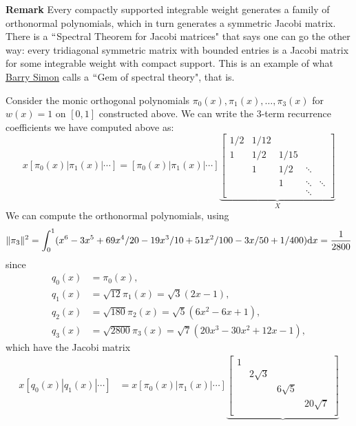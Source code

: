 \textbf{Remark} Every compactly supported integrable weight generates a family of orthonormal polynomials, which in turn generates a symmetric Jacobi matrix. There is a \ensuremath{\ldq}Spectral Theorem for Jacobi matrices" that says one can go the other way: every tridiagonal symmetric matrix with bounded entries is a Jacobi matrix for some integrable weight with compact support. This is an example of what \href{https://en.wikipedia.org/wiki/Barry_Simon}{Barry Simon} calls a \ensuremath{\ldq}Gem of spectral theory", that is.

\begin{example} Consider the monic orthogonal polynomials $\ensuremath{\pi}_0(x),\ensuremath{\pi}_1(x),\ensuremath{\ldots},\ensuremath{\pi}_3(x)$ for $w(x) = 1$ on $[0,1]$ constructed above. We can write the 3-term recurrence coefficients we have computed above as:
\[
x [\ensuremath{\pi}_0(x)| \ensuremath{\pi}_1(x)| \ensuremath{\cdots}] = [\ensuremath{\pi}_0(x)| \ensuremath{\pi}_1(x)| \ensuremath{\cdots}] \underbrace{\begin{bmatrix} 1/2 & 1/12 \\
                                                            1 & 1/2 & 1/15 \\
                                                            & 1 & 1/2 & \ensuremath{\ddots} \\
                                                            & & 1 & \ensuremath{\ddots} & \ensuremath{\ddots} \\
                                                            &&& \ensuremath{\ddots} \end{bmatrix}}_X
\]
We can compute the orthonormal polynomials, using
\[
\|\ensuremath{\pi}_3\|^2 = \int_0^1 (x^6 - 3x^5 + 69x^4/20 -19x^3/10 + 51x^2/100 - 3x/50 + 1/400) {\rm d}x = {1 \over 2800}
\]
since
\begin{align*}
q_0(x) &= \ensuremath{\pi}_0(x), \\
q_1(x) &= \sqrt{12} \ensuremath{\pi}_1(x)= \sqrt{3} (2  x - 1), \\
q_2(x) &= \sqrt{180} \ensuremath{\pi}_2(x) = \sqrt{5} (6x^2 - 6x + 1), \\
q_3(x) &= \sqrt{2800} \ensuremath{\pi}_3(x) = \sqrt{7} (20x^3-30x^2 + 12x - 1),
\end{align*}
which have the Jacobi matrix
\begin{align*}
x [q_0(x)| q_1(x)| \ensuremath{\cdots}] &= x [\ensuremath{\pi}_0(x)| \ensuremath{\pi}_1(x)| \ensuremath{\cdots}] \underbrace{\begin{bmatrix} 1 \\ & 2\sqrt{3} \\ && 6 \sqrt{5} \\ &&& 20 \sqrt{7} \\

\end{bmatrix}}
\end{align*}
\end{example}
